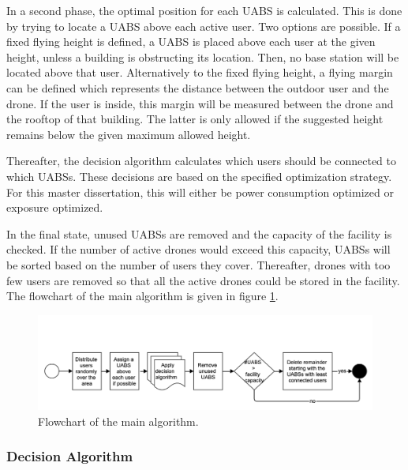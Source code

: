 In a second phase, the optimal position for each \gls{UABS} is calculated. This is done by trying to locate a \gls{UABS} above each active user. Two options are possible.
If a fixed flying height is defined, a \gls{UABS} is placed above each user at the given height, unless a building is obstructing its location. Then, no base station will be located above that user.
Alternatively to the fixed flying height, a flying margin can be defined which represents the distance between the outdoor user and  the drone.
If the user is inside, this margin will be measured between the drone and the rooftop of that building.
The latter is only allowed if the suggested height remains below the given maximum allowed height.

Thereafter, the decision algorithm calculates which users should be connected to which \gls{UABS}s. 
These decisions are based on the specified optimization strategy. For this master dissertation,
this will either be power consumption optimized or exposure optimized.

In the final state, unused \gls{UABS}s are removed and the capacity of the facility is checked. 
If the number of active drones would exceed this capacity, \gls{UABS}s will be sorted based on the number of 
users they cover. Thereafter, drones with too few users are removed so that all the active drones could be stored in the facility.
The flowchart of the main algorithm is given in figure \ref{fig:mainflow}.
\begin{figure}[h!]
\centering
 \includegraphics[width=\textwidth]{../images/mainflow.png}
  \caption{Flowchart of the main algorithm.}
  \label{fig:mainflow}
\end{figure}

\subsubsection{Decision Algorithm}


